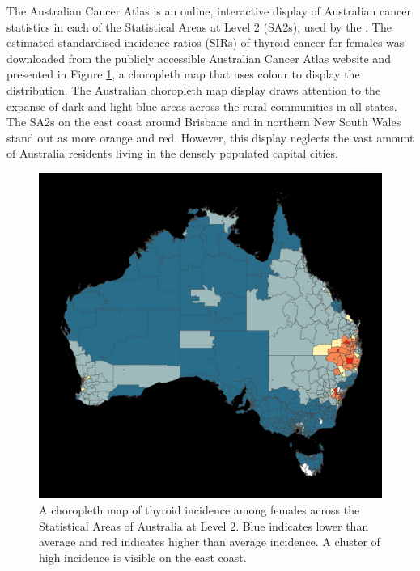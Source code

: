 The Australian Cancer Atlas is an online, interactive display of
Australian cancer statistics in each of the Statistical Areas at Level 2
(SA2s), used by the \citet{abs2011}. The estimated standardised
incidence ratios (SIRs) of thyroid cancer for females was downloaded
from the publicly accessible Australian Cancer Atlas website and
presented in Figure \ref{fig:choro}, a choropleth map that uses colour
to display the distribution. The Australian choropleth map display draws
attention to the expanse of dark and light blue areas across the rural
communities in all states. The SA2s on the east coast around Brisbane
and in northern New South Wales stand out as more orange and red.
However, this display neglects the vast amount of Australia residents
living in the densely populated capital cities.

\begin{Schunk}
\begin{figure}
\includegraphics[width=0.95\linewidth]{kobakian-cook_files/figure-latex/choro-1} \caption[A choropleth map of thyroid incidence among females across the Statistical Areas of Australia at Level 2]{A choropleth map of thyroid incidence among females across the Statistical Areas of Australia at Level 2. Blue indicates lower than average and red indicates higher than average incidence. A cluster of high incidence is visible on the east coast.}\label{fig:choro}
\end{figure}
\end{Schunk}

